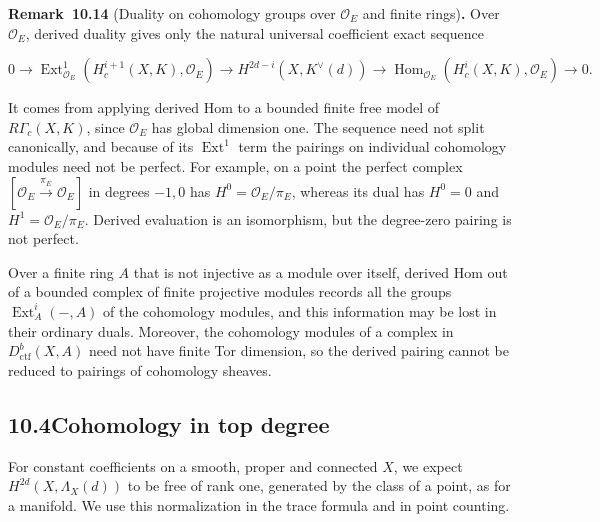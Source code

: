 \documentclass[11pt]{article}
\newenvironment{bpstatement}[2]{\par\addvspace{0.6\baselineskip}\noindent\textbf{#1}#2\textbf{.}\enspace\ignorespaces}
  {\par\addvspace{0.4\baselineskip}}
\providecommand{\Ext}{}\renewcommand{\Ext}{\operatorname{Ext}}
\providecommand{\Hom}{}\renewcommand{\Hom}{\operatorname{Hom}}
\begin{document}
\label{bp143}%
\begin{bpstatement}{Remark~10.14}{ (Duality on cohomology groups over $\mathcal O_E$ and finite rings)}
Over \(\mathcal O_E\), derived duality gives only the natural universal coefficient exact sequence

\[
0\longrightarrow
\Ext^1_{\mathcal O_E}(H_c^{i+1}(X,K),\mathcal O_E)
\longrightarrow H^{2d-i}(X,K^\vee(d))
\longrightarrow
\Hom_{\mathcal O_E}(H_c^i(X,K),\mathcal O_E)
\longrightarrow0.
\]

It comes from applying derived Hom to a bounded finite free model of \(R\Gamma_c(X,K)\), since \(\mathcal O_E\) has global dimension one. The sequence need not split canonically, and because of its \(\Ext^1\) term the pairings on individual cohomology modules need not be perfect. For example, on a point the perfect complex \([\mathcal O_E\xrightarrow{\pi_E}\mathcal O_E]\) in degrees \(-1,0\) has \(H^0=\mathcal O_E/\pi_E\), whereas its dual has \(H^0=0\) and \(H^1=\mathcal O_E/\pi_E\). Derived evaluation is an isomorphism, but the degree-zero pairing is not perfect.

Over a finite ring \(A\) that is not injective as a module over itself, derived Hom out of a bounded complex of finite projective modules records all the groups \(\Ext^i_A(-,A)\) of the cohomology modules, and this information may be lost in their ordinary duals. Moreover, the cohomology modules of a complex in \(D^b_{\mathrm{ctf}}(X,A)\) need not have finite Tor dimension, so the derived pairing cannot be reduced to pairings of cohomology sheaves.
\end{bpstatement}


\subsection*{\texorpdfstring{10.4\quad Cohomology in top degree}{10.4 Cohomology in top degree}}
\label{bp144}%
\label{bp145}%
For constant coefficients on a smooth, proper and connected \(X\), we expect \(H^{2d}(X,\Lambda_X(d))\) to be free of rank one, generated by the class of a point, as for a manifold. We use this normalization in the trace formula and in point counting.
\end{document}
